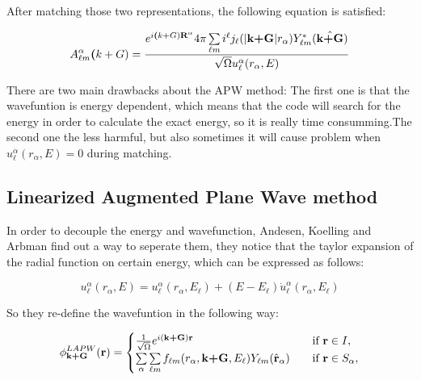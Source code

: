 \documentclass[a4paper, 12pt, titlepage,oneside,drop]{kthesis}
\begin{document}
\noindent After matching those two representations, the following equation is satisfied:

\begin{equation}
A _{{\ell}m}^{\alpha} \textbf(k+G)= \frac{ e^{i \textbf(k+G) \textbf{R}^{\alpha} } 4 \pi \sumlm<\ell><m> i^{\ell} \bessf< |\textbf{k+G}|> \sphfq<\ell{m}><\textbf{k+G}><*> }{\sqrt{\Omega} u_{{\ell}}^{\alpha}(r_{\alpha}, E)}
\end{equation}

\noindent There are two main drawbacks about the APW method:
The first one is that the wavefuntion is energy dependent, which means that the code will search for the energy in order to calculate the exact energy, so it 
is really time consumming.The second one the less harmful, but also sometimes it will cause problem when $u_{{\ell}}^{\alpha}(r_{\alpha}, E) = 0$ during matching. 

\subsection{Linearized Augmented Plane Wave method}
\noindent In order to decouple the energy and wavefunction, Andesen, Koelling and Arbman find out a way to seperate them, they notice that the taylor expansion of the radial function
on certain energy, which can be expressed as follows:

\begin{equation}\label{ap3}
 u_{{\ell}}^{\alpha}(r_{\alpha}, E) = u_{{\ell}}^{\alpha}(r_{\alpha}, E_{\ell}) + (E-E_{\ell}) \dot{u}_{{\ell}}^{\alpha}(r_{\alpha}, E_{\ell})
\end{equation}

\noindent So they re-define the wavefuntion in the following way:


\begin{equation}\label{lap4}
\phi^{LAPW}_\textbf{k+G} (\textbf{r})= 
\begin{cases} \frac {1}{\sqrt{\Omega}} e^{i(\textbf{k+G})\textbf{r}} & \quad \mbox{if $\textbf{r} \in I, $}
\\
\sumg<\alpha>\sum\limits_{{\ell}m} f_{{\ell}{m}} (r_{\alpha},\textbf{k+G}, E_{\ell}) Y_{{\ell}m}(\hat{\textbf{r}}_{\alpha})  & \quad \mbox{if $\textbf{r} \in S_\alpha, $}\\ 
\end{cases}
\end{equation}
\end{document}
